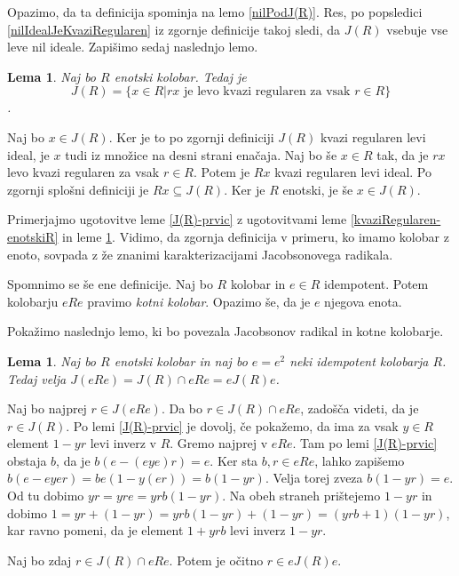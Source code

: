 \documentclass[a4paper, 12pt]{amsart}
\theoremstyle{definition} %
\theoremstyle{plain} %
\newtheorem{lema}[definicija]{Lema}
\begin{document}
Opazimo, da ta definicija spominja na lemo \ref{nilPodJ(R)}. Res, po popsledici \ref{nilIdealJeKvaziRegularen} iz zgornje definicije takoj sledi, da $J(R)$ vsebuje vse leve nil ideale. Zapišimo sedaj naslednjo lemo.

\begin{lema}
\label{J(R)-splosen-elementi}
Naj bo $R$ enotski kolobar. Tedaj je 
$$
J(R) = \{ x\in R | rx \text{ je levo kvazi regularen za vsak } r \in R\}
$$.
\end{lema}

\proof
Naj bo $x\in J(R)$. Ker je to po zgornji definiciji $J(R)$ kvazi regularen levi ideal, je $x$ tudi iz množice na desni strani enačaja. Naj bo še $x\in R$ tak, da je $rx$ levo kvazi regularen za vsak $r\in R$. Potem je $Rx$ kvazi regularen levi ideal. Po zgornji splošni definiciji je $Rx \subseteq J(R)$. Ker je $R$ enotski, je še $x\in J(R)$. 
\endproof

Primerjajmo ugotovitve leme \ref{J(R)-prvic} z ugotovitvami leme \ref{kvaziRegularen-enotskiR} in leme \ref{J(R)-splosen-elementi}. Vidimo, da zgornja definicija v primeru, ko imamo kolobar z enoto, sovpada z že znanimi karakterizacijami Jacobsonovega radikala.

Spomnimo se še ene definicije. Naj bo $R$ kolobar in $e\in R$ idempotent. Potem kolobarju $eRe$ pravimo \emph{kotni kolobar}. Opazimo še, da je $e$ njegova enota.

Pokažimo naslednjo lemo, ki bo povezala Jacobsonov radikal in kotne kolobarje.

\begin{lema}
\label{J(R)-kotniKolobar}
Naj bo $R$ enotski kolobar in naj bo $e=e^2$ neki idempotent kolobarja $R$. Tedaj velja $J(eRe) = J(R) \cap eRe = eJ(R)e$.
\end{lema}

\proof
Naj bo najprej $r\in J(eRe)$. Da bo $r\in J(R) \cap eRe$, zadošča videti, da je $r\in J(R)$. Po lemi \ref{J(R)-prvic} je dovolj, če pokažemo, da ima za vsak $y\in R$ element $1-yr$ levi inverz v $R$. Gremo najprej v $eRe$. Tam po lemi \ref{J(R)-prvic} obstaja $b$, da je $b(e-(eye) r) = e$. Ker sta $b,r\in eRe$, lahko zapišemo $b(e-eyer) = be(1-y(er)) = b(1-yr)$. Velja torej zveza $b(1-yr) = e$. Od tu dobimo $yr=yre = yrb(1-yr)$. Na obeh straneh prištejemo $1-yr$ in dobimo $1 = yr + (1-yr) = yrb(1-yr) + (1-yr) = (yrb+1)(1-yr)$, kar ravno pomeni, da je element $1+yrb$ levi inverz $1-yr$.

Naj bo zdaj $r\in J(R) \cap eRe$. Potem je očitno $r\in eJ(R)e$.
\end{document}
